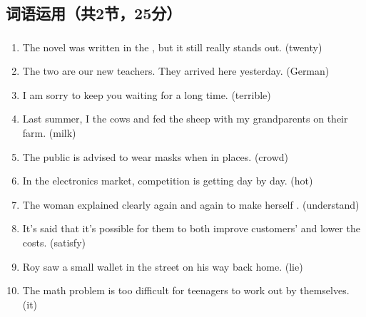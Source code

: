 \documentclass{ExamJHSEngl}
\begin{document}
\subsection{词语运用（共2节，25分）}

\subsubsection{}

\countercontinue

\begin{enumerate}[start=\value{orders}+1,label={\arabic*.},leftmargin=2em,itemsep=0.75ex]
  \item The novel was written in the , but it still really stands out. (twenty)
  \item The two  are our new teachers. They arrived here yesterday. (German)
  \item I am  sorry to keep you waiting for a long time. (terrible)
  \item Last summer, I  the cows and fed the sheep with my grandparents on their farm. (milk)
  \item The public is advised to wear masks when in  places. (crowd)
  \item In the electronics market, competition is getting  day by day. (hot)
  \item The woman explained clearly again and again to make herself . (understand)
  \item It's said that it's possible for them to both improve customers'  and lower the costs. (satisfy)
  \item Roy saw a small wallet  in the street on his way back home. (lie)
  \item The math problem  is too difficult for teenagers to work out by themselves. (it)
\end{enumerate}


\subsubsection{}
\end{document}
